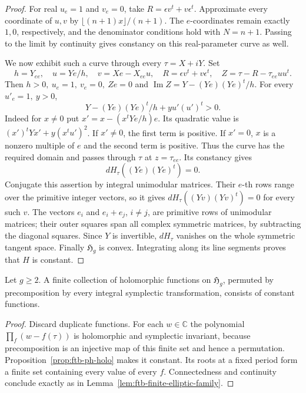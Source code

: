 \begin{proof}
For real \(u_e=1\) and \(v_e=0\), take
\(R=\epsilon v^t+v\epsilon^t\).
Approximate every coordinate of \(u,v\) by
\(\lfloor(n+1)x\rfloor/(n+1)\).
The \(e\)-coordinates remain exactly \(1,0\), respectively, and
the denominator conditions hold with \(N=n+1\).
Passing to the limit by continuity gives constancy on this
real-parameter curve as well.

We now exhibit such a curve through every \(\tau=X+iY\).
Set
\[
 h=Y_{ee},\quad u=Ye/h,\quad
 v=Xe-X_{ee}u,\quad
 R=\epsilon v^t+v\epsilon^t,\quad
 Z=\tau-R-\tau_{ee}uu^t .
\]
Then \(h>0,\ u_e=1,\ v_e=0,\ Ze=0\) and
\(\operatorname{Im}Z=Y-(Ye)(Ye)^t/h\).
For every \(u'_e=1,\ y>0\),
\[
                   Y-(Ye)(Ye)^t/h+yu'(u')^t>0.
\]
Indeed for \(x\ne0\) put
\(x'=x-(x^tYe/h)e\).
Its quadratic value is
\((x')^tYx'+y(x^tu')^2\).
If \(x'\ne0\), the first term is positive.
If \(x'=0\), \(x\) is a nonzero multiple of \(e\) and the second
term is positive.  Thus the curve has the required domain and
passes through \(\tau\) at \(z=\tau_{ee}\).
Its constancy gives
\[
                     dH_\tau((Ye)(Ye)^t)=0.
\]
Conjugate this assertion by integral unimodular matrices.
Their \(e\)-th rows range over the primitive integer vectors,
so it gives
\(dH_\tau((Yv)(Yv)^t)=0\) for every such \(v\).
The vectors \(e_i\) and \(e_i+e_j\), \(i\ne j\), are primitive
rows of unimodular matrices; their outer squares span all complex
symmetric matrices, by subtracting the diagonal squares.
Since \(Y\) is invertible, \(dH_\tau\) vanishes on the whole
symmetric tangent space.
Finally \(\mathfrak H_g\) is convex.  Integrating along its line
segments proves that \(H\) is constant.
\end{proof}

\begin{srcorollary}
\label{cor:ftb-finite-sp-family}
Let \(g\geq2\).  A finite collection of holomorphic functions on
\(\mathfrak H_g\), permuted by precomposition by every integral
symplectic transformation, consists of constant functions.
\end{srcorollary}
\begin{proof}
Discard duplicate functions.
For each \(w\in\mathbb C\) the polynomial
\(\prod_f(w-f(\tau))\) is holomorphic and symplectic invariant,
because precomposition is an injective map of this finite set
and hence a permutation.
Proposition~\ref{prop:ftb-ph-holo} makes it constant.
Its roots at a fixed period form a finite set containing every
value of every \(f\).  Connectedness and continuity conclude
exactly as in Lemma~\ref{lem:ftb-finite-elliptic-family}.
\end{proof}

